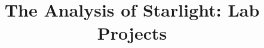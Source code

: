 \documentclass[12pt]{article}
\title{The Analysis of Starlight: Lab Projects}
\begin{document}
\setcounter{page}{1}
\setcounter{equation}{0}
\pagestyle{plain}
\thispagestyle{empty}  %

\def\lo {\ifmmode {\,{\it L}\solar} \else $\,L$\solar\fi}       %
\def\my {\ifmmode {\,{\it M}\solar\,{\rm yr^{-1}}}              %
        \else {$\,M$\solar$\,$yr$^{\rm -1}$}\fi}
\def\arcsec{\ifmmode {^{\scriptscriptstyle\prime\prime}}
          \else $^{\scriptscriptstyle\prime\prime}$\fi}
\def\arcminm{\ifmmode {^{\scriptscriptstyle\prime}}
          \else $^{\scriptscriptstyle\prime}$\fi}
\def\deg{\ifmmode^\circ\else$^\circ$\fi}



 
\end{document}
